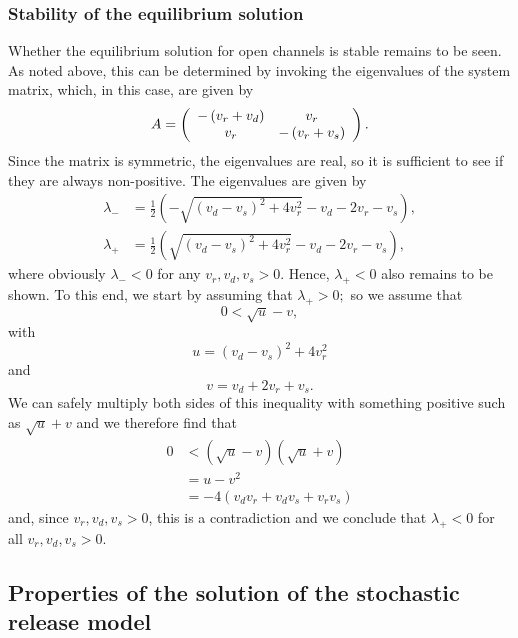\subsubsection{Stability of the equilibrium solution}

Whether the equilibrium solution for open channels is stable remains to be seen.
As noted above, this can be determined by invoking the eigenvalues of
the system matrix, which, in this case, are given by%
\[
A=\left(
\begin{array}
[c]{cc}%
-\left(  v_{r}+v_{d}\right)   & v_{r}\\
v_{r} & -\left(  v_{r}+v_{s}\right)
\end{array}
\right)  .
\]
Since the matrix is symmetric, the eigenvalues are real, so it is sufficient to see if they are always non-positive.
 The eigenvalues are given by
\begin{align*}
\lambda_{-} &  =\frac{1}{2}\left(  -\sqrt{\left(  v_{d}-v_{s}\right)
^{2}+4v_{r}^{2}}-v_{d}-2v_{r}-v_{s}\right)  ,\\
\lambda_{+} &  =\frac{1}{2}\left(  \sqrt{\left(  v_{d}-v_{s}\right)
^{2}+4v_{r}^{2}}-v_{d}-2v_{r}-v_{s}\right),
\end{align*}
where obviously \bigskip$\lambda_{-}<0$ for any $v_{r},v_{d},v_{s}>0.$ Hence,
$\lambda_{+}<0$ also remains to be shown. To this end, we start by
assuming that $\lambda_{+}>0;$ so we assume that
\[
0<\sqrt{u}-v,
\]
with%
\[
u=\left(  v_{d}-v_{s}\right)  ^{2}+4v_{r}^{2}%
\]
and%
\[
v=v_{d}+2v_{r}+v_{s}.
\]
We can safely multiply both sides of this inequality with something positive
such as $\sqrt{u}+v$ and we therefore find that%
\begin{align*}
0 &  <\left(  \sqrt{u}-v\right)  \left(  \sqrt{u}+v\right)  \\
&  =u-v^{2}\\
&  =-4\left(  v_{d}v_{r}+v_{d}v_{s}+v_{r}v_{s}\right)
\end{align*}
and, since $v_{r},v_{d},v_{s}>0$, this is a contradiction and we conclude that
$\lambda_{+}<0$ for all $v_{r},v_{d},v_{s}>0.$

\subsection{Properties of the solution of the stochastic release model}

